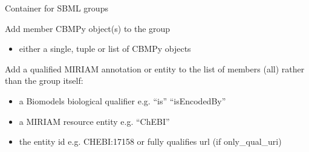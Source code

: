 \documentclass[letterpaper,10pt,english]{sphinxmanual}
\begin{document}
\begin{fulllineitems}
\label{\detokenize{modules_doc:cbmpy.CBModel.Group}}
\pysigstartsignatures
{}
\pysigstopsignatures
\sphinxAtStartPar
Container for SBML groups

\begin{fulllineitems}
\label{\detokenize{modules_doc:cbmpy.CBModel.Group.addMember}}
\pysigstartsignatures
{}
\pysigstopsignatures
\sphinxAtStartPar
Add member CBMPy object(s) to the group
\begin{itemize}
\item {} 
\sphinxAtStartPar
{} either a single, tuple or list of CBMPy objects

\end{itemize}

\end{fulllineitems}


\begin{fulllineitems}
\label{\detokenize{modules_doc:cbmpy.CBModel.Group.addSharedMIRIAMannotation}}
\pysigstartsignatures
{}
\pysigstopsignatures
\sphinxAtStartPar
Add a qualified MIRIAM annotation or entity to the list of members (all) rather than the group itself:
\begin{itemize}
\item {} 
\sphinxAtStartPar
{} a Biomodels biological qualifier e.g. “is” “isEncodedBy”

\item {} 
\sphinxAtStartPar
{} a MIRIAM resource entity e.g. “ChEBI”

\item {} 
\sphinxAtStartPar
{} the entity id e.g. CHEBI:17158 or fully qualifies url (if only\_qual\_uri)

\end{itemize}


\end{fulllineitems}
\end{fulllineitems}
\end{document}
